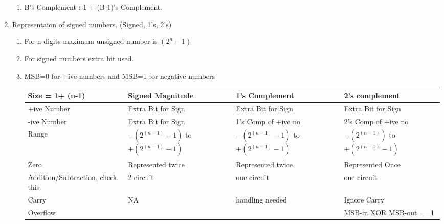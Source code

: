 \begin{enumerate}
\begin{minipage}{\linewidth}
\begin{enumerate}
        \item B's Complement : 1 + (B-1)'s Complement. \\
    \end{enumerate}
    \end{minipage}


    \item Representaion of signed numbers. (Signed, 1's, 2's)
    \begin{enumerate}
        \item For n digits maximum unsigned number is \( (2^n -1) \)
        \item For signed numbers extra bit used.
        \item MSB=0 for +ive numbers and MSB=1 for negative numbers \\
    \begin{myTableStyle} \begin{tabular}{ |m{3cm}|m{3cm}|m{3cm}|m{3cm}| } \hline
        Size = 1+ (n-1)     & Signed Magnitude           & 1's Complement       & 2's complement        \\ \hline
        +ive Number         & Extra Bit for Sign         & Extra Bit for Sign   & Extra Bit for Sign    \\ \hline
        -ive Number         & Extra Bit for Sign         & 1's Comp of +ive no  & 2's Comp of +ive no   \\ \hline
        Range               & \makecell[l]{ \( -(2^{(n-1)} -1) \) to \\ \( +(2^{(n-1)} -1) \) }
                                                         & \makecell[l]{ \( -(2^{(n-1)} -1) \) to \\ \( +(2^{(n-1)} -1) \) }
                                                         & \makecell[l]{ \( -(2^{(n-1)}) \) to \\ \( +(2^{(n-1)} -1) \) }   \\ \hline
        Zero                & Represented twice          & Represented twice    & Represented Once   \\ \hline
        Addition/Subtraction, check this&  2 circuit     & one circuit          &   one circuit      \\ \hline
        Carry               & NA                         & handling needed      &   Ignore Carry         \\ \hline
        Overflow            &                            &                      &   MSB-in XOR MSB-out ==1        \\ \hline
    \end{tabular} \end{myTableStyle} \vspace{0.08in}
    \end{enumerate}


\end{enumerate}

